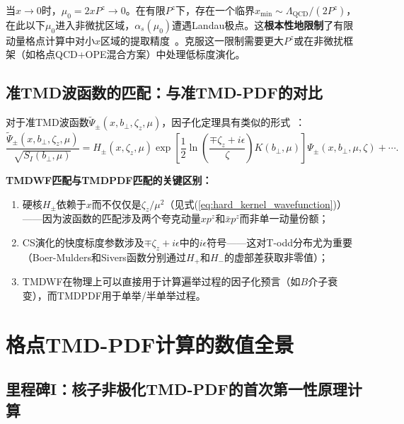 \documentclass[12pt,a4paper]{ctexart}
\theoremstyle{definition}
\begin{document}
当$x \to 0$时，$\mu_0 = 2xP^z \to 0$。在有限$P^z$下，存在一个临界$x_{\min} \sim \Lambda_{\text{QCD}}/(2P^z)$，在此以下$\mu_0$进入非微扰区域，$\alpha_s(\mu_0)$遭遇Landau极点。这\textbf{根本性地限制}了有限动量格点计算中对小$x$区域的提取精度~\cite{He2024unpolTMD}。克服这一限制需要更大$P^z$或在非微扰框架（如格点QCD+OPE混合方案）中处理低标度演化。

\subsection{准TMD波函数的匹配：与准TMD-PDF的对比}

对于准TMD波函数$\tilde\Psi_\pm(x, b_\perp, \zeta_z, \mu)$，因子化定理具有类似的形式~\cite{Chu2022CSkernel,Chu2023TMDWF}：
\begin{equation}
\frac{\tilde\Psi_\pm(x, b_\perp, \zeta_z, \mu)}{\sqrt{S_I(b_\perp, \mu)}} = H_\pm(x, \zeta_z, \mu) \exp\!\left[ \frac{1}{2} \ln\!\left(\frac{\mp\zeta_z + i\epsilon}{\zeta}\right) K(b_\perp, \mu) \right] \Psi_\pm(x, b_\perp, \mu, \zeta) + \cdots.
\label{eq:TMDWF_factorization}
\end{equation}

\textbf{TMDWF匹配与TMDPDF匹配的关键区别：}
\begin{enumerate}
    \item 硬核$H_\pm$依赖于$x$而不仅仅是$\zeta_z/\mu^2$（见式(\ref{eq:hard_kernel_wavefunction})）——因为波函数的匹配涉及两个夸克动量$xp^z$和$\bar{x}p^z$而非单一动量份额；
    \item CS演化的快度标度参数涉及$\mp\zeta_z + i\epsilon$中的$i\epsilon$符号——这对T-odd分布尤为重要（Boer-Mulders和Sivers函数分别通过$H_+$和$H_-$的虚部差获取非零值）；
    \item TMDWF在物理上可以直接用于计算遍举过程的因子化预言（如$B$介子衰变），而TMDPDF用于单举/半单举过程。
\end{enumerate}

\section{格点TMD-PDF计算的数值全景}

\subsection{里程碑I：核子非极化TMD-PDF的首次第一性原理计算~\cite{He2024unpolTMD}}
\end{document}
